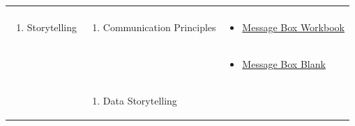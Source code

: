 \documentclass[
]{book}
\providecommand{\tightlist}{%
  \setlength{\itemsep}{0pt}\setlength{\parskip}{0pt}}
\begin{document}
\begin{longtable}[]{@{}lll@{}}
\begin{minipage}[t]{0.34\columnwidth}
\end{minipage} & \begin{minipage}[t]{0.42\columnwidth}\raggedright
\strut
\end{minipage}\tabularnewline
\begin{minipage}[t]{0.15\columnwidth}\raggedright
\begin{enumerate}
\def\labelenumi{\arabic{enumi}.}
\setcounter{enumi}{3}
\tightlist
\item
  Storytelling
\end{enumerate}\strut
\end{minipage} & \begin{minipage}[t]{0.34\columnwidth}\raggedright
\begin{enumerate}
\def\labelenumi{\arabic{enumi}.}
\tightlist
\item
  Communication Principles
\end{enumerate}\strut
\end{minipage} & \begin{minipage}[t]{0.42\columnwidth}\raggedright
\begin{itemize}
\tightlist
\item
  \href{https://www.compassscicomm.org/wp-content/uploads/2020/05/The-Message-Box-Workbook.pdf}{Message Box Workbook}
\end{itemize}\strut
\end{minipage}\tabularnewline
\begin{minipage}[t]{0.15\columnwidth}\raggedright
\strut
\end{minipage} & \begin{minipage}[t]{0.34\columnwidth}\raggedright
\strut
\end{minipage} & \begin{minipage}[t]{0.42\columnwidth}\raggedright
\begin{itemize}
\tightlist
\item
  \href{files/Message-Box-Blank.pdf}{Message Box Blank}
\end{itemize}\strut
\end{minipage}\tabularnewline
\begin{minipage}[t]{0.15\columnwidth}\raggedright
\strut
\end{minipage} & \begin{minipage}[t]{0.34\columnwidth}\raggedright
\begin{enumerate}
\def\labelenumi{\arabic{enumi}.}
\setcounter{enumi}{1}
\tightlist
\item
  Data Storytelling
\end{enumerate}\strut

\end{minipage}
\end{longtable}
\end{document}
